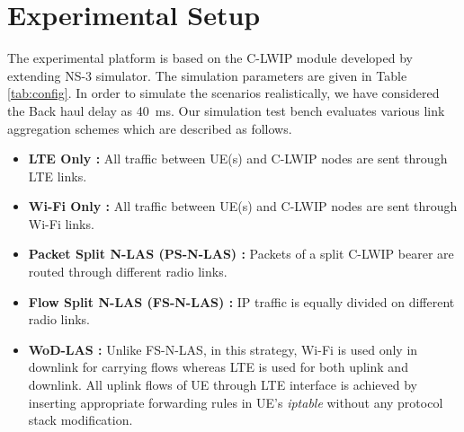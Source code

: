 \documentclass[conference]{IEEEtran}
\newcommand{\modify}[1]{{#1}}
\begin{document}
\section{Experimental Setup}
\label{sec:simResults}
The experimental platform is based on the C-LWIP module developed by extending NS-3 simulator. The simulation parameters are given in Table \ref{tab:config}. In order to simulate the scenarios realistically, we have considered the Back haul delay as 40~ms. Our simulation test bench evaluates various link aggregation schemes which are described as follows.
\begin{itemize}
\item \textbf{LTE Only :} All traffic between UE(s) and C-LWIP nodes are sent through LTE links.
\item \textbf{Wi-Fi Only :} All traffic between UE(s) and C-LWIP nodes are sent through Wi-Fi links.
\item \textbf{Packet Split N-LAS (PS-N-LAS) :} Packets of a split C-LWIP bearer are routed through different radio links.
\item \textbf{Flow Split N-LAS (FS-N-LAS) :} IP traffic is equally divided on different radio links.
\item \textbf{WoD-LAS :} Unlike FS-N-LAS, in this strategy, Wi-Fi is used only in downlink for carrying flows whereas LTE is used for both uplink and downlink. \modify{All uplink flows of UE through LTE interface is achieved by inserting appropriate forwarding rules in UE's \textit{iptable}} without any protocol stack modification.
\end{itemize}
\end{document}
